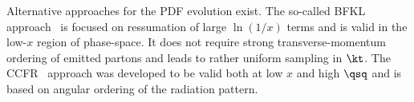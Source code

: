 Alternative approaches for the PDF evolution exist. The so-called BFKL approach~\cite{Balitsky:1978,Kuraev:1977fs} is focused on ressumation of large $\ln{\left(1/x\right)}$ terms and is valid in the low-$x$ region of phase-space. It does not require strong transverse-momentum ordering of emitted partons and leads to rather uniform sampling in $\kt$. The CCFR~\cite{Ciafaloni:1987ur,Catani:1989sg,Catani:1989yc,Martin:1996by} approach was developed to be valid both at low $x$ and high $\qsq$ and is based on angular ordering of the radiation pattern.